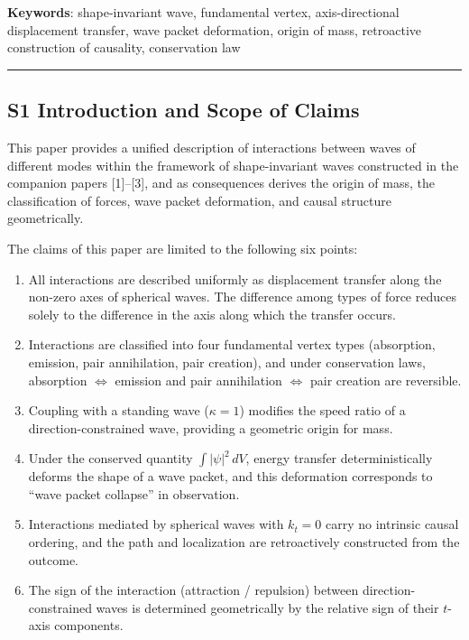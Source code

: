 \documentclass[
  a4paper,11pt]{article}
\providecommand{\tightlist}{%
  \setlength{\itemsep}{0pt}\setlength{\parskip}{0pt}}
\theoremstyle{definition}
\theoremstyle{remark}
\begin{document}
\textbf{Keywords}: shape-invariant wave, fundamental vertex,
axis-directional displacement transfer, wave packet deformation, origin
of mass, retroactive construction of causality, conservation law

\begin{center}\rule{0.5\linewidth}{0.5pt}\end{center}

\subsection{S1 Introduction and Scope of
Claims}\label{s1-introduction-and-scope-of-claims}

This paper provides a unified description of interactions between waves
of different modes within the framework of shape-invariant waves
constructed in the companion papers {[}1{]}--{[}3{]}, and as
consequences derives the origin of mass, the classification of forces,
wave packet deformation, and causal structure geometrically.

The claims of this paper are limited to the following six points:

\begin{enumerate}
\def\labelenumi{\arabic{enumi}.}
\tightlist
\item
  All interactions are described uniformly as displacement transfer
  along the non-zero axes of spherical waves. The difference among types
  of force reduces solely to the difference in the axis along which the
  transfer occurs.
\item
  Interactions are classified into four fundamental vertex types
  (absorption, emission, pair annihilation, pair creation), and under
  conservation laws, absorption \(\Leftrightarrow\) emission and pair
  annihilation \(\Leftrightarrow\) pair creation are reversible.
\item
  Coupling with a standing wave (\(\kappa = 1\)) modifies the speed
  ratio of a direction-constrained wave, providing a geometric origin
  for mass.
\item
  Under the conserved quantity \(\int |\psi|^2 \, dV\), energy transfer
  deterministically deforms the shape of a wave packet, and this
  deformation corresponds to ``wave packet collapse'' in observation.
\item
  Interactions mediated by spherical waves with \(k_t = 0\) carry no
  intrinsic causal ordering, and the path and localization are
  retroactively constructed from the outcome.
\item
  The sign of the interaction (attraction / repulsion) between
  direction-constrained waves is determined geometrically by the
  relative sign of their \(t\)-axis components.
\end{enumerate}
\end{document}

